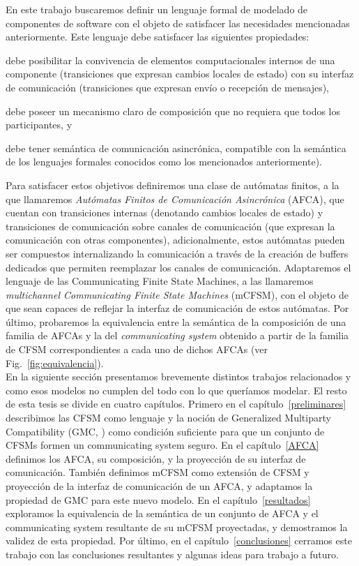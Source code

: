 En este trabajo buscaremos definir un lenguaje formal de modelado de componentes de software con el objeto de satisfacer las necesidades mencionadas anteriormente. Este lenguaje debe satisfacer las siguientes propiedades:
\begin{inparaenum}[1.]
\item debe posibilitar la convivencia de elementos computacionales internos de una componente (transiciones que expresan cambios locales de estado) con su interfaz de comunicación (transiciones que expresan envío o recepción de mensajes),
\item debe poseer un mecanismo claro de composición que no requiera que todos los participantes, y
\item debe tener semántica de comunicación asincrónica, compatible con la semántica de los lenguajes formales conocidos como los mencionados anteriormente).
\end{inparaenum}

Para satisfacer estos objetivos definiremos una clase de autómatas finitos, a la que llamaremos \emph{Autómatas Finitos de Comunicación Asincrónica} (AFCA), que cuentan con transiciones internas (denotando cambios locales de estado) y transiciones de comunicación sobre canales de comunicación (que expresan la comunicación con otras componentes), adicionalmente, estos autómatas pueden ser compuestos internalizando la comunicación a través de la creación de buffers dedicados que permiten reemplazar los canales de comunicación. Adaptaremos el lenguaje de las Communicating Finite State Machines, a las llamaremos \emph{multichannel Communicating Finite State Machines} (mCFSM), con el objeto de que sean capaces de reflejar la interfaz de comunicación de estos autómatas. Por último, probaremos la equivalencia entre la semántica de la composición de una familia de AFCAs y la del \emph{communicating system} obtenido a partir de la familia de CFSM correspondientes a cada uno de dichos AFCAs (ver Fig.~\ref{fig:equivalencia}).\\

En la siguiente sección presentamos brevemente distintos trabajos relacionados y como esos modelos no cumplen del todo con lo que queríamos modelar. El resto de esta tesis se divide en cuatro capítulos. Primero en el capítulo~\ref{preliminares} describimos las CFSM como lenguaje y la noción de Generalized Multiparty Compatibility (GMC, \cite{lange:popl15}) como condición suficiente para que un conjunto de CFSMs formen un communicating system seguro. En el capítulo~\ref{AFCA} definimos los AFCA, su composición, y la proyección de su interfaz de comunicación. También definimos mCFSM como extensión de CFSM y proyección de la interfaz de comunicación de un AFCA, y adaptamos la propiedad de GMC para este nuevo modelo. En el capítulo~\ref{resultados} exploramos la equivalencia de la semántica de un conjunto de AFCA y el communicating system resultante de su mCFSM proyectadas, y demostramos la validez de esta propiedad. Por último, en el capítulo~\ref{conclusiones} cerramos este trabajo con las conclusiones resultantes y algunas ideas para trabajo a futuro.


